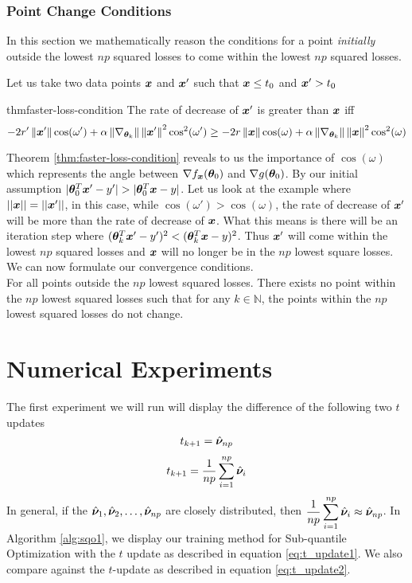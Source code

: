 \documentclass{article} %
\newcommand{\norm}[1]{\left\lVert#1\right\rVert}
\begin{document}
	\subsubsection{Point Change Conditions}
	
	In this section we mathematically reason the conditions for a point \textit{initially} outside the lowest $np$ squared losses to come within the lowest $np$ squared losses.
	
	Let us take two data points ${\bm{x}}$ and ${\bm{x}}'$ such that ${\bm{x}} \leq t_0$ and ${\bm{x}}' > t_0$
	\begin{restatable}{thm}{faster-loss-condition}
		\label{thm:faster-loss-condition}
		The rate of decrease of ${\bm{x}}'$ is greater than ${\bm{x}}$ iff \vspace{1em} 
		\begin{equation}
			-2r'\norm{\vx'}\cos(\omega') + \alpha \norm{\nabla_{\vtheta_k}}\norm{\vx'}^2\cos^2(\omega')\geq -2r\norm{\vx}\cos(\omega) + \alpha \norm{\nabla_{\vtheta_k}}\norm{\vx}^2\cos^2(\omega)	
		\end{equation}
	\end{restatable}
	Theorem \ref{thm:faster-loss-condition} reveals to us the importance of $\cos(\omega)$ which represents the angle between $\nabla f_{\bm{x}}({\bm{\theta}}_0)$ and $\nabla g({\bm{\theta}}_0)$. By our initial assumption $|{\bm{\theta}}_0^T{\bm{x}}' - y'| > |{\bm{\theta}}_0^T{\bm{x}} - y|$. Let us look at the example where $|| {\bm{x}} || = || {\bm{x}}' ||$, in this case, while $\cos(\omega') > \cos(\omega)$, the rate of decrease of ${\bm{x}}'$ will be more than the rate of decrease of ${\bm{x}}$. What this means is there will be an iteration step where $({\bm{\theta}}_k^T{\bm{x}}' - y')^2 < ({\bm{\theta}}_k^T{\bm{x}} - y)^2$. Thus ${\bm{x}}'$ will come within the lowest $np$ squared losses and ${\bm{x}}$ will no longer be in the $np$ lowest square losses. We can now formulate our convergence conditions. \\
	For all points outside the $np$ lowest squared losses. There exists no point within the $np$ lowest squared losses such that for any $k \in \mathbb{N}$, the points within the $np$ lowest squared losses do not change. 
			

	
	\section{Numerical Experiments}\label{sec:numerical-experiments}

	The first experiment we will run will display the difference of the following two $t$ updates \begin{equation} \label{eq:t_update1} t_{k+1} = \hat{{\bm{\nu}}}_{np}\end{equation}  \begin{equation} \label{eq:t_update2} t_{k+1} = \frac{1}{np}\sum_{i=1}^{np}\hat{{\bm{\nu}}}_i \end{equation}In general, if the $\hat{{\bm{\nu}}}_1, \hat{{\bm{\nu}}}_2, \dots, \hat{{\bm{\nu}}}_{np}$ are closely distributed, then $\displaystyle \frac{1}{np}\sum_{i=1}^{np}\hat{{\bm{\nu}}}_{i} \approx \hat{{\bm{\nu}}}_{np}$. In Algorithm \ref{alg:sqo1}, we display our training method for Sub-quantile Optimization with the $t$ update as described in equation \ref{eq:t_update1}. We also compare against the $t$-update as described in equation \ref{eq:t_update2}. 
	
\end{document}
